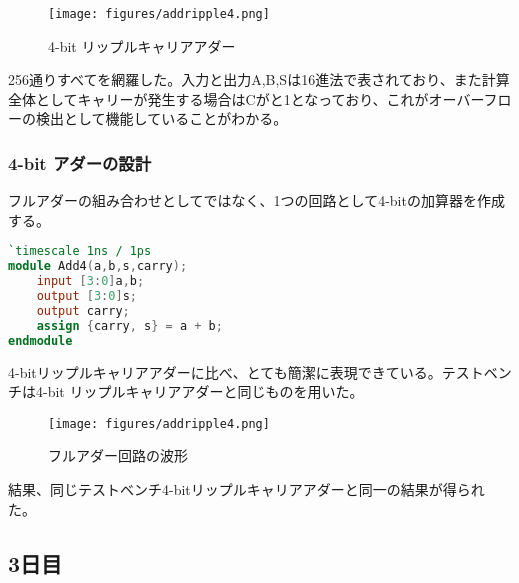 \documentclass[titlepage]{ltjsarticle}
\begin{document}
\begin{figure}[H]
    \begin{center}
        \texttt{[image: figures/addripple4.png]}
        \caption{4-bit リップルキャリアアダー}
    \end{center}
\end{figure}
256通りすべてを網羅した。入力と出力A,B,Sは16進法で表されており、また計算全体としてキャリーが発生する場合はCがと1となっており、これがオーバーフローの検出として機能していることがわかる。
\subsubsection{4-bit アダーの設計}
フルアダーの組み合わせとしてではなく、1つの回路として4-bitの加算器を作成する。
\begin{lstlisting}[caption=4-bit アダー,language=verilog]
`timescale 1ns / 1ps
module Add4(a,b,s,carry); 
    input [3:0]a,b;
    output [3:0]s;
    output carry;
    assign {carry, s} = a + b;
endmodule    
\end{lstlisting}
4-bitリップルキャリアアダーに比べ、とても簡潔に表現できている。テストベンチは4-bit リップルキャリアアダーと同じものを用いた。
\begin{figure}[H]
    \begin{center}
        \texttt{[image: figures/addripple4.png]}
        \caption{フルアダー回路の波形}
    \end{center}
\end{figure}
結果、同じテストベンチ4-bitリップルキャリアアダーと同一の結果が得られた。
\subsection{3日目}
\end{document}

